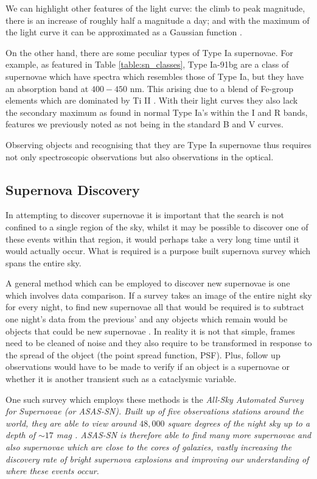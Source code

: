 \documentclass[twocolumn]{revtex4}
\begin{document}
We can highlight other features of the light curve: the climb to peak magnitude, there is an increase of roughly half a magnitude a day; and with the maximum of the light curve it can be approximated as a Gaussian function \cite{mod_ast}. 

On the other hand, there are some peculiar types of Type Ia supernovae. For example, as featured in Table \ref{table:sn_classes}, Type Ia-91bg are a class of supernovae which have spectra which resembles those of Type Ia, but they have an absorption band at $400-450$ nm. This arising due to a blend of Fe-group elements which are dominated by Ti II \cite{obs_phys_class_sn}. With their light curves they also lack the secondary maximum as found in normal Type Ia's within the I and R bands, features we previously noted as not being in the standard B and V curves.

Observing objects and recognising that they are Type Ia supernovae thus requires not only spectroscopic observations but also observations in the optical. 

\vspace{-3ex}
\subsection{Supernova Discovery}
\vspace{-2ex}
In attempting to discover supernovae it is important that the search is not confined to a single region of the sky, whilst it may be possible to discover one of these events within that region, it would perhaps take a very long time until it would actually occur. What is required is a purpose built supernova survey which spans the entire sky. 

A general method which can be employed to discover new supernovae is one which involves data comparison. If a survey takes an image of the entire night sky for every night, to find new supernovae all that would be required is to subtract one night's data from the previous' and any objects which remain would be objects that could be new supernovae \cite{assasn-rev}. In reality it is not that simple, frames need to be cleaned of noise and they also require to be transformed in response to the spread of the object (the point spread function, PSF). Plus, follow up observations would have to be made to verify if an object is a supernovae or whether it is another transient such as a cataclysmic variable. 

One such survey which employs these methods is the \em{All-Sky Automated Survey for Supernovae }\em (or ASAS-SN). Built up of five observations stations around the world, they are able to view around $48,000$ square degrees of the night sky up to a depth of $\sim 17$ mag \cite{asn_lc}. ASAS-SN is therefore able to find many more supernovae and also supernovae which are close to the cores of galaxies, vastly increasing the discovery rate of bright supernova explosions and improving our understanding of where these events occur.
\end{document}
